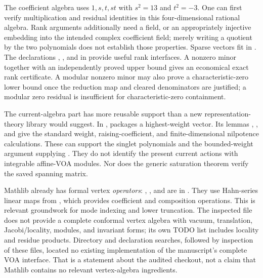 The coefficient algebra uses $1,s,t,st$ with $s^2=13$ and $t^2=-3$.
One can first verify multiplication and residual identities in this
four-dimensional rational algebra. Rank arguments additionally need
a field, or an appropriately injective embedding into the intended
complex coefficient field; merely writing a quotient by the two
polynomials does not establish those properties. Sparse vectors fit
 in
.
The declarations ,
, and
 in
 provide useful rank
interfaces. A nonzero minor together with an independently proved
upper bound gives an economical exact rank certificate. A modular
nonzero minor may also prove a characteristic-zero lower bound once
the reduction map and cleared denominators are justified; a modular
zero residual is insufficient for characteristic-zero containment.

The current-algebra part has more reusable support than a new
representation-theory library would suggest. In
,
 packages a highest-weight
vector. Its lemmas ,
, and
 give the standard weight,
raising-coefficient, and finite-dimensional nilpotence calculations.
These can support the singlet polynomials and the bounded-weight
argument supplying .
They do not identify the present current actions with integrable
affine-VOA modules. Nor does the generic saturation theorem verify
the saved spanning matrix.

Mathlib already has formal vertex \emph{operators}:
, , and
 are in
.
They use Hahn-series linear maps from
, which provides
coefficient and composition operations. This is relevant groundwork
for mode indexing and lower truncation. The inspected file does not
provide a complete conformal vertex algebra with vacuum, translation,
Jacobi/locality, modules, and invariant forms; its own TODO list
includes locality and residue products. Directory and declaration
searches, followed by inspection of these files, located no existing
implementation of the manuscript's complete VOA interface. That is
a statement about the audited checkout, not a claim that Mathlib
contains no relevant vertex-algebra ingredients.

